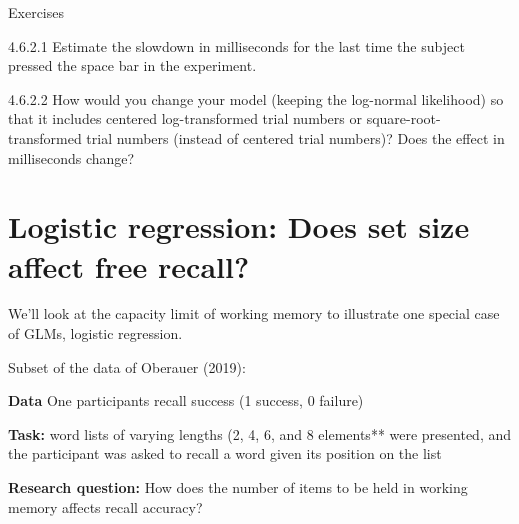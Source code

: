 \documentclass[12pt,ignorenonframetext,aspectratio=169]{beamer}
\begin{document}
\begin{frame}

\begin{block}{\color{blue} Exercises}

4.6.2.1 Estimate the slowdown in milliseconds for the last time the subject pressed the space bar in the experiment.

4.6.2.2 How would you change your model (keeping the log-normal likelihood) so that it includes centered log-transformed trial numbers or square-root-transformed trial numbers (instead of centered trial numbers)? Does the effect in milliseconds change?

\end{block}

\end{frame}

\hypertarget{sec:logistic}{%
\section{Logistic regression: Does set size affect free recall?}\label{sec:logistic}}

\begin{frame}

We'll look at the capacity limit of working memory to illustrate one special case of GLMs, logistic regression.

Subset of the data of Oberauer (2019):

\textbf{Data}
One participants recall success (1 success, 0 failure)

\textbf{Task:}
word lists of varying lengths (2, 4, 6, and 8 elements** were presented, and the participant was asked to recall a word given its position on the list

\textbf{Research question:}
How does the number of items to be held in working memory affects recall accuracy?

\end{frame}
\end{document}

